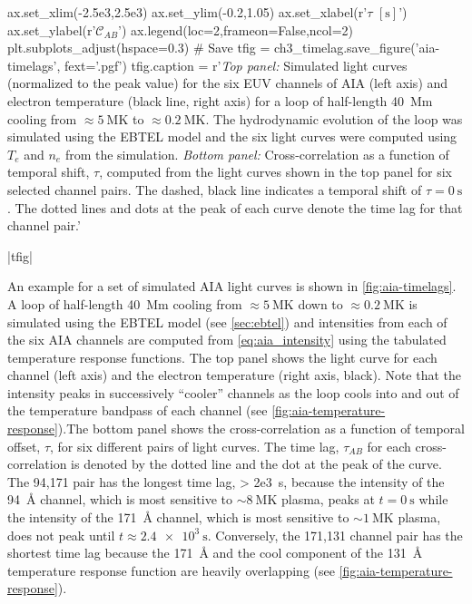 \begin{pycode}
ax.set_xlim(-2.5e3,2.5e3)
ax.set_ylim(-0.2,1.05)
ax.set_xlabel(r'$\tau$ $[\si{\second}]$')
ax.set_ylabel(r'$\mathcal{C}_{AB}$')
ax.legend(loc=2,frameon=False,ncol=2)
plt.subplots_adjust(hspace=0.3)
# Save
tfig = ch3_timelag.save_figure('aia-timelags', fext='.pgf')
tfig.caption = r'\textit{Top panel:} Simulated light curves (normalized to the peak value) for the six EUV channels of AIA (left axis) and electron temperature (black line, right axis) for a loop of half-length \SI{40}{\mega\m} cooling from $\approx\SI{5}{\mega\kelvin}$ to $\approx\SI{0.2}{\mega\kelvin}$. The hydrodynamic evolution of the loop was simulated using the EBTEL model and the six light curves were computed using $T_e$ and $n_e$ from the simulation. \textit{Bottom panel:} Cross-correlation as a function of temporal shift, $\tau$, computed from the light curves shown in the top panel for six selected channel pairs. The dashed, black line indicates a temporal shift of $\tau=\SI{0}{\second}$. The dotted lines and dots at the peak of each curve denote the time lag for that channel pair.'
\end{pycode}
|tfig|

An example for a set of simulated AIA light curves is shown in \autoref{fig:aia-timelags}. A loop of half-length \SI{40}{\mega\m} cooling from $\approx\SI{5}{\mega\kelvin}$ down to $\approx\SI{0.2}{\mega\kelvin}$ is simulated using the EBTEL model (see \autoref{sec:ebtel}) and intensities from each of the six AIA channels are computed from \autoref{eq:aia_intensity} using the tabulated temperature response functions. The top panel shows the light curve for each channel (left axis) and the electron temperature (right axis, black). Note that the intensity peaks in successively ``cooler'' channels as the loop cools into and out of the temperature bandpass of each channel (see \autoref{fig:aia-temperature-response}).The bottom panel shows the cross-correlation as a function of temporal offset, $\tau$, for six different pairs of light curves. The time lag, $\tau_{AB}$ for each cross-correlation is denoted by the dotted line and the dot at the peak of the curve. The 94,171 pair has the longest time lag, \SI{> 2e3}{\second}, because the intensity of the \SI{94}{\angstrom} channel, which is most sensitive to $\sim\SI{8}{\mega\kelvin}$ plasma, peaks at $t=\SI{0}{\second}$ while the intensity of the \SI{171}{\angstrom} channel, which is most sensitive to $\sim\SI{1}{\mega\kelvin}$ plasma, does not peak until $t\approx\SI{2.4e3}{\second}$. Conversely, the 171,131 channel pair has the shortest time lag because the \SI{171}{\angstrom} and the cool component of the \SI{131}{\angstrom} temperature response function are heavily overlapping (see \autoref{fig:aia-temperature-response}). 

